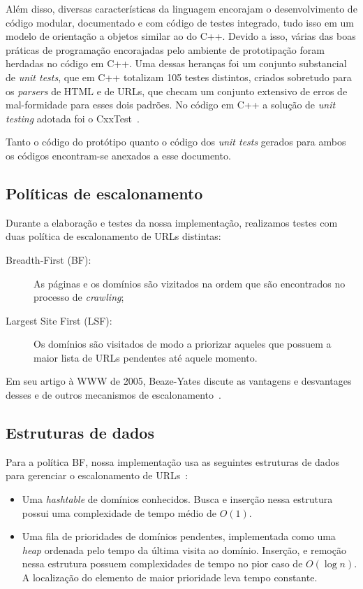 \documentclass[10pt,twocolumn]{article}
\begin{document}
Além disso, diversas características da linguagem encorajam o
desenvolvimento de código modular, documentado e com código de testes
integrado, tudo isso em um modelo de orientação a objetos
similar ao do C++. Devido a isso, várias das boas práticas de
programação encorajadas pelo ambiente de prototipação foram herdadas no
código em C++. Uma dessas heranças foi um conjunto substancial de \emph{unit
tests}, que em C++ totalizam 105 testes distintos,
 criados sobretudo para os
\emph{parsers} de HTML e de URLs, que checam um conjunto extensivo de
erros de mal-formidade para esses dois padrões. No código em C++ a
solução de \emph{unit testing} adotada foi o CxxTest~\cite{cxxtest}.

Tanto o código do protótipo quanto o código dos \emph{unit tests} gerados para
ambos os códigos encontram-se anexados a esse documento.

\subsection{Políticas de escalonamento}

Durante a elaboração e testes da nossa implementação, realizamos testes
com duas política de escalonamento de URLs distintas:
\begin{description}
\item[Breadth-First (BF):] As páginas e os domínios são vizitados na ordem que
são encontrados no processo de \emph{crawling};
\item[Largest Site First (LSF):] Os domínios são visitados de modo a priorizar
aqueles que possuem a maior lista de URLs pendentes até aquele momento.
\end{description}

Em seu artigo à WWW de 2005, Beaze-Yates discute as vantagens e
desvantages desses e de outros mecanismos de
escalonamento~\cite{baezayates2005crawling}.



\subsection{Estruturas de dados}

Para a política BF, nossa implementação usa as seguintes estruturas de
dados para gerenciar o escalonamento de URLs~\cite{cormen-algorithms}:

\begin{itemize}
\item Uma \emph{hashtable} de domínios conhecidos. Busca e inserção
nessa estrutura possui uma complexidade de tempo médio de \(O\left(1 
\right)\).
\item Uma fila de prioridades de domínios pendentes, implementada como
uma \emph{heap} ordenada pelo tempo da última visita ao domínio.
Inserção, e remoção nessa estrutura possuem
complexidades de tempo no pior caso de \(O\left(\log n\right)\). A
localização do elemento de maior prioridade leva tempo constante.
\end{itemize}
\end{document}
